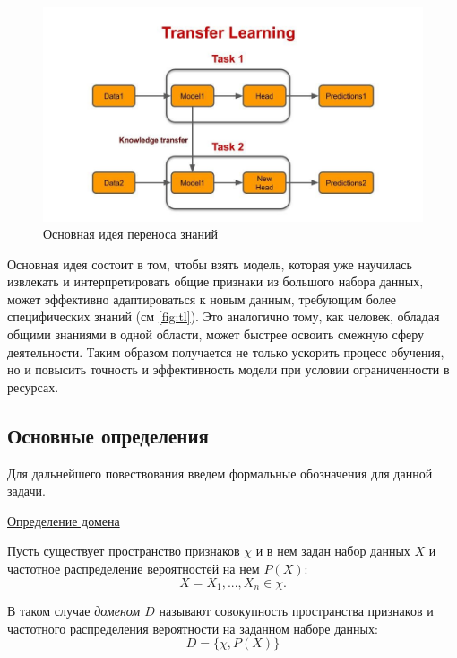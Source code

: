 \begin{figure}[h]
	\centering
	\includegraphics[width=\textwidth]{./images/TL_medium.jpg}
	\caption{Основная идея переноса знаний}
	\label{fig:tl}
\end{figure}

Основная идея состоит в том, чтобы взять модель, которая уже научилась извлекать и интерпретировать общие признаки из большого набора данных, может эффективно адаптироваться к новым данным, требующим более специфических знаний (см \autoref{fig:tl}). Это аналогично тому, как человек, обладая общими знаниями в одной области, может быстрее освоить смежную сферу деятельности. Таким образом получается не только ускорить процесс обучения, но и повысить точность и эффективность модели при условии ограниченности в ресурсах. 

\subsection{Основные определения}

Для дальнейшего повествования введем формальные обозначения для данной задачи.

\underline{Определение домена}

Пусть существует пространство признаков $\chi$ и в нем задан набор данных $X$ и частотное распределение вероятностей на нем $P(X)$:
\begin{equation}
	X = {X_1, ..., X_n} \in \chi.
\end{equation}

В таком случае \textit{доменом $D$} называют совокупность пространства признаков и частотного распределения вероятности на заданном наборе данных:
\begin{equation}
D = \{\chi, P(X)\}
\end{equation}

